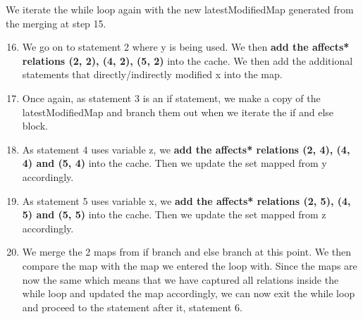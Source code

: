 \documentclass[12pt]{article}
\begin{document}
{{{{{{{{{{{{{{\begin{center}
\begin{minipage}{15em}
\begin{flushleft}
\end{flushleft}
\end{minipage}
\hspace{20mm}
\begin{minipage}{20em}
\normalsize
We iterate the while loop again with the new latestModifiedMap generated from the merging at step 15.
\begin{enumerate}
 \setcounter{enumi}{15}
\item We go on to statement 2 where y is being used. We then \textbf{add the affects* relations (2, 2), (4, 2), (5, 2)} into the cache. We then add the additional statements that directly/indirectly modified x into the map.
\item Once again, as statement 3 is an if statement, we make a copy of the latestModifiedMap and branch them out when we iterate the if and else block.
\item As statement 4 uses variable z, we \textbf{add the affects* relations (2, 4), (4, 4) and (5, 4)} into the cache. Then we update the set mapped from y accordingly.
\item As statement 5 uses variable x, we \textbf{add the affects* relations (2, 5), (4, 5) and (5, 5)} into the cache. Then we update the set mapped from z accordingly. 
\item We merge the 2 maps from if branch and else branch at this point. We then compare the map with the map we entered the loop with. Since the maps are now the same which means that we have captured all relations inside the while loop and updated the map accordingly, we can now exit the while loop and proceed to the statement after it, statement 6.
\end{enumerate}
\end{minipage}
\end{center}
\normalsize


}}}}}}}}}}}}}}
\end{document}
